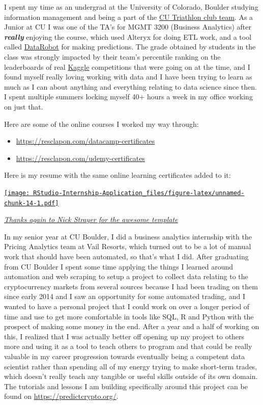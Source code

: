 \documentclass[
]{book}
\begin{document}
I spent my time as an undergrad at the University of Colorado, Boulder studying information management and being a part of the \href{https://www.cutriathlon.com/}{CU Triathlon club team}. As a Junior at CU I was one of the TA's for MGMT 3200 (Business Analytics) after \textbf{\emph{really}} enjoying the course, which used Alteryx for doing ETL work, and a tool called \href{https://www.datarobot.com/}{DataRobot} for making predictions. The grade obtained by students in the class was strongly impacted by their team's percentile ranking on the leaderboards of real \href{https://www.kaggle.com/}{Kaggle} competitions that were going on at the time, and I found myself really loving working with data and I have been trying to learn as much as I can about anything and everything relating to data science since then. I spent multiple summers locking myself 40+ hours a week in my office working on just that.

Here are some of the online courses I worked my way through:

\begin{itemize}
\item
  \url{https://resclapon.com/datacamp-certificates}
\item
  \url{https://resclapon.com/udemy-certificates}
\end{itemize}

Here is my resume with the same online learning certificates added to it:

\href{https://ricky-cv.netlify.com/}{\texttt{[image: RStudio-Internship-Application\_files/figure-latex/unnamed-chunk-14-1.pdf]}}

\emph{\href{https://github.com/nstrayer/cv}{Thanks again to Nick Strayer for the awesome template}}

In my senior year at CU Boulder, I did a business analytics internship with the Pricing Analytics team at Vail Resorts, which turned out to be a lot of manual work that should have been automated, so that's what I did. After graduating from CU Boulder I spent some time applying the things I learned around automation and web scraping to setup a project to collect data relating to the cryptocurrency markets from several sources because I had been trading on them since early 2014 and I saw an opportunity for some automated trading, and I wanted to have a personal project that I could work on over a longer period of time and use to get more comfortable in tools like SQL, R and Python with the prospect of making some money in the end. After a year and a half of working on this, I realized that I was actually better off opening up my project to others more and using it as a tool to teach others to program and that could be really valuable in my career progression towards eventually being a competent data scientist rather than spending all of my energy trying to make short-term trades, which doesn't really teach any tangible or useful skills outside of its own domain. The tutorials and lessons I am building specifically around this project can be found on \url{https://predictcrypto.org/}.
\end{document}
